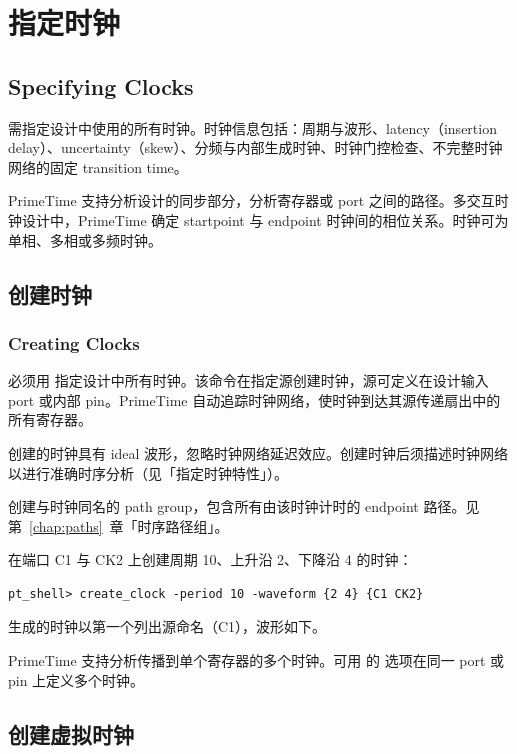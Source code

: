 \section{指定时钟}
\subsection*{Specifying Clocks}

需指定设计中使用的所有时钟。时钟信息包括：周期与波形、latency（insertion delay）、uncertainty（skew）、分频与内部生成时钟、时钟门控检查、不完整时钟网络的固定 transition time。

PrimeTime 支持分析设计的同步部分，分析寄存器或 port 之间的路径。多交互时钟设计中，PrimeTime 确定 startpoint 与 endpoint 时钟间的相位关系。时钟可为单相、多相或多频时钟。

\subsection{创建时钟}
\subsubsection*{Creating Clocks}

必须用  指定设计中所有时钟。该命令在指定源创建时钟，源可定义在设计输入 port 或内部 pin。PrimeTime 自动追踪时钟网络，使时钟到达其源传递扇出中的所有寄存器。

 创建的时钟具有 ideal 波形，忽略时钟网络延迟效应。创建时钟后须描述时钟网络以进行准确时序分析（见「指定时钟特性」）。

 创建与时钟同名的 path group，包含所有由该时钟计时的 endpoint 路径。见第~\ref{chap:paths}~章「时序路径组」。

在端口 C1 与 CK2 上创建周期 10、上升沿 2、下降沿 4 的时钟：
\begin{lstlisting}
pt_shell> create_clock -period 10 -waveform {2 4} {C1 CK2}
\end{lstlisting}

生成的时钟以第一个列出源命名（C1），波形如下。


PrimeTime 支持分析传播到单个寄存器的多个时钟。可用  的  选项在同一 port 或 pin 上定义多个时钟。

\subsection{创建虚拟时钟}
